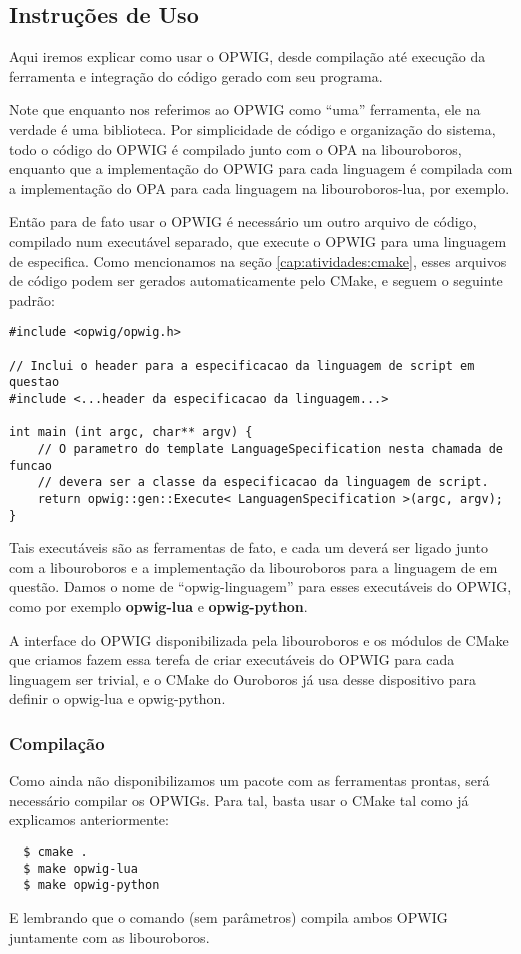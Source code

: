 \subsection{Instruções de Uso}
Aqui iremos explicar como usar o OPWIG, desde compilação até execução da ferramenta
e integração do código gerado com seu programa.

Note que enquanto nos referimos ao OPWIG como ``uma'' ferramenta, ele na verdade
é uma biblioteca. Por simplicidade de código e organização do sistema, 
todo o código do OPWIG é compilado junto com o OPA na libouroboros, enquanto que 
a implementação do OPWIG para cada linguagem é compilada com a implementação do
OPA para cada linguagem na libouroboros-lua, por exemplo.

Então para de fato usar o OPWIG é necessário um outro arquivo de código, compilado
num executável separado, que execute o OPWIG para uma linguagem de \script{} especifica.
Como mencionamos na seção \ref{cap:atividades:cmake}, esses arquivos de código podem
ser gerados automaticamente pelo CMake, e seguem o seguinte padrão:
\begin{lstlisting}
#include <opwig/opwig.h>

// Inclui o header para a especificacao da linguagem de script em questao
#include <...header da especificacao da linguagem...>

int main (int argc, char** argv) {
    // O parametro do template LanguageSpecification nesta chamada de funcao
    // devera ser a classe da especificacao da linguagem de script.
    return opwig::gen::Execute< LanguagenSpecification >(argc, argv);
}
\end{lstlisting}
Tais executáveis são as ferramentas de fato, e cada um deverá ser ligado junto com a
libouroboros e a implementação da libouroboros para a linguagem de \script{} em questão. 
Damos o nome de ``opwig-linguagem'' para esses executáveis do OPWIG, como por exemplo
\textbf{opwig-lua} e \textbf{opwig-python}.

A interface do OPWIG disponibilizada pela libouroboros e os módulos de CMake
que criamos fazem essa terefa de criar executáveis do OPWIG para cada linguagem ser trivial,
e o CMake do Ouroboros já usa desse dispositivo para definir o opwig-lua e opwig-python.

\subsubsection{Compilação}
Como ainda não disponibilizamos um pacote com as ferramentas prontas, será necessário
compilar os OPWIGs. Para tal, basta usar o CMake tal como já explicamos anteriormente:
\begin{verbatim}
  $ cmake .
  $ make opwig-lua
  $ make opwig-python
\end{verbatim}
E lembrando que o comando  (sem parâmetros) compila ambos OPWIG juntamente com
as libouroboros.

